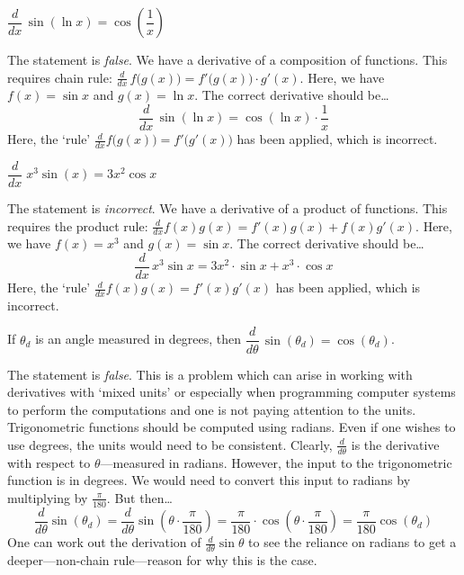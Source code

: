 \documentclass[11pt,letterpaper]{article}
\begin{document}
 $\dfrac{d}{dx} \, \sin(\ln x)= \cos \left( \dfrac{1}{x} \right)$ \pspace

\sol The statement is \textit{false}. We have a derivative of a composition of functions. This requires chain rule: $\frac{d}{dx}\, f \big( g(x) \big)= f' \big( g(x) \big) \cdot g'(x)$. Here, we have $f(x)= \sin x$ and $g(x)= \ln x$. The correct derivative should be\dots
	\[
	\dfrac{d}{dx} \, \sin(\ln x)= \cos(\ln x) \cdot \dfrac{1}{x}
	\]
Here, the `rule' $\frac{d}{dx} f \big( g(x) \big)= f' \big( g'(x) \big)$ has been applied, which is incorrect. \pvspace{1.3cm}



\newpage



 $\dfrac{d}{dx} \; x^3 \sin(x)= 3x^2 \cos x$ \pspace

\sol The statement is \textit{incorrect}. We have a derivative of a product of functions. This requires the product rule: $\frac{d}{dx} f(x) g(x)= f'(x) g(x) + f(x) g'(x)$. Here, we have $f(x)= x^3$ and $g(x)= \sin x$. The correct derivative should be\dots
	\[
	\dfrac{d}{dx}\, x^3 \sin x= 3x^2 \cdot \sin x + x^3 \cdot \cos x
	\]
Here, the `rule' $\frac{d}{dx} f(x) g(x)= f'(x) g'(x)$ has been applied, which is incorrect. \pvspace{1.3cm}



 If $\theta_d$ is an angle measured in degrees, then $\dfrac{d}{d\theta}\, \sin(\theta_d)= \cos(\theta_d)$. \pspace

\sol The statement is \textit{false}. This is a problem which can arise in working with derivatives with `mixed units' or especially when programming computer systems to perform the computations and one is not paying attention to the units. Trigonometric functions should be computed using radians. Even if one wishes to use degrees, the units would need to be consistent. Clearly, $\frac{d}{d\theta}$ is the derivative with respect to $\theta$---measured in radians. However, the input to the trigonometric function is in degrees. We would need to convert this input to radians by multiplying by $\frac{\pi}{180}$. But then\dots
	\[
	\dfrac{d}{d\theta} \sin(\theta_d)= \dfrac{d}{d\theta} \sin \left(\theta \cdot \dfrac{\pi}{180} \right)= \dfrac{\pi}{180} \cdot \cos \left(\theta \cdot \dfrac{\pi}{180} \right)= \dfrac{\pi}{180} \cos \left( \theta_d \right)
	\]
One can work out the derivation of $\frac{d}{d\theta} \sin \theta$ to see the reliance on radians to get a deeper---non-chain rule---reason for why this is the case. \pvspace{1.3cm}
\end{document}
